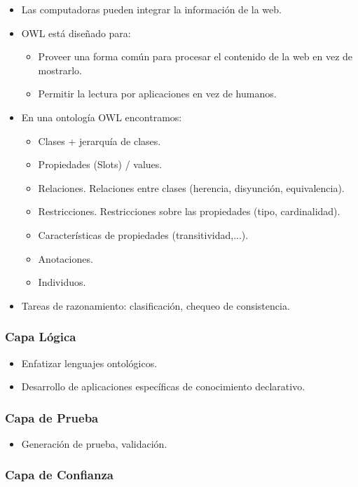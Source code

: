 \documentclass[a4paper,12pt,twoside,final,spanish]{article}
\begin{document}
\begin{itemize}
\item Las computadoras pueden integrar la información de la web.
\item OWL está diseñado para:
	\begin{itemize}
	\item Proveer una forma común para procesar el contenido de la web en vez de  			mostrarlo.
	\item Permitir la lectura por aplicaciones en vez de humanos.
	\end{itemize}
\item En una ontología OWL encontramos:
	\begin{itemize}
	\item Clases + jerarquía de clases.
	\item Propiedades (Slots) / values.
	\item Relaciones. Relaciones entre clases (herencia, disyunción, equivalencia).
	\item Restricciones. Restricciones sobre las propiedades (tipo, cardinalidad).
	\item Características de propiedades (transitividad,...).
	\item Anotaciones.
	\item Individuos.
	\end{itemize}
\item Tareas de razonamiento: clasificación, chequeo de consistencia.
\end{itemize}

\subsubsection{Capa Lógica}

\begin{itemize}
\item Enfatizar lenguajes ontológicos.
\item Desarrollo de aplicaciones específicas de conocimiento declarativo.
\end{itemize}

\subsubsection{Capa de Prueba}

\begin{itemize}
\item Generación de prueba, validación.
\end{itemize}

\subsubsection{Capa de Confianza}
\end{document}
